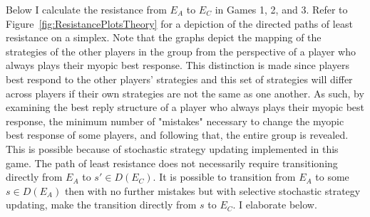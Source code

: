 Below I calculate the resistance from $E_A$ to $E_C$ in Games 1, 2, and 3. Refer to Figure~\ref{fig:ResistancePlotsTheory} for a depiction of the directed paths of least resistance on a simplex. Note that the graphs depict the mapping of the strategies of the other players in the group from the perspective of a player who always plays their myopic best response. This distinction is made since players best respond to the other players' strategies and this set of strategies will differ across players if their own strategies are not the same as one another. As such, by examining the best reply structure of a player who always plays their myopic best response, the minimum number of "mistakes" necessary to change the myopic best response of some players, and following that, the entire group is revealed. This is possible because of stochastic strategy updating implemented in this game. The path of least resistance does not necessarily require transitioning directly from $E_A$ to $s' \in D(E_C)$. It is possible to transition from $E_A$ to some $s \in D(E_A)$ then with no further mistakes but with selective stochastic strategy updating, make the transition directly from $s$ to $E_C$. I elaborate below. 

